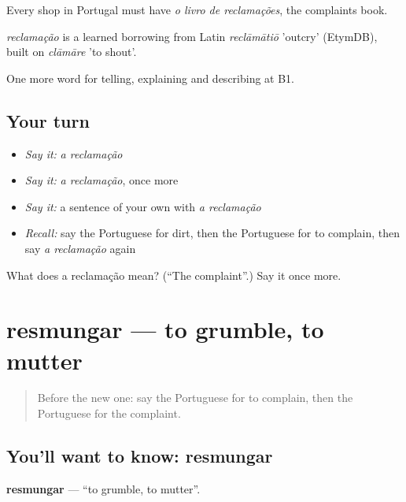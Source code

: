 Every shop in Portugal must have \emph{o livro de reclamações}, the complaints book.

\begin{cousinweb}
\emph{reclamação} is a learned borrowing from Latin \emph{reclāmātiō} 'outcry' (EtymDB), built on \emph{clāmāre} 'to shout'.
\end{cousinweb}

\begin{grammarlens}[title={What you've built}]
One more word for telling, explaining and describing at B1.
\end{grammarlens}

\subsection*{Your turn}
\begin{itemize}
\raggedright
  \item \emph{Say it:} \emph{a reclamação}
  \item \emph{Say it:} \emph{a reclamação}, once more
  \item \emph{Say it:} a sentence of your own with \emph{a reclamação}
  \item \emph{Recall:} say the Portuguese for dirt, then the Portuguese for to complain, then say \emph{a reclamação} again
\end{itemize}

\begin{tcolorbox}[breakable,colback=teal!4,colframe=teal!35!black,title={Before you move on}]
What does a reclamação mean? (\textquotedblleft{}The complaint\textquotedblright{}.) Say it once more.
\end{tcolorbox}
\section[resmungar]{resmungar — to grumble, to mutter}

\label{lesson:PT-C434-resmungar}



\begin{quote}
Before the new one: say the Portuguese for to complain, then the Portuguese for the complaint.
\end{quote}

\subsection*{You'll want to know: resmungar}
\textbf{resmungar} — \textquotedblleft{}to grumble, to mutter\textquotedblright{}.

